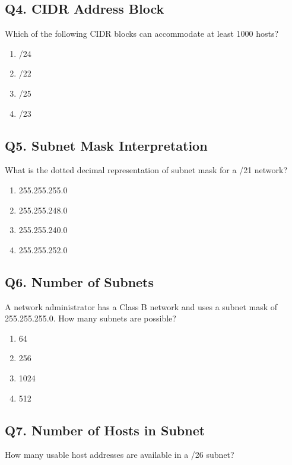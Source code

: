 \vspace{1em}
\subsection*{Q4. CIDR Address Block}
Which of the following CIDR blocks can accommodate at least 1000 hosts?

\begin{enumerate}[label=(\alph*)]
    \item /24  
    \item /22  
    \item /25  
    \item /23  
\end{enumerate}

\vspace{1em}
\subsection*{Q5. Subnet Mask Interpretation}
What is the dotted decimal representation of subnet mask for a /21 network?

\begin{enumerate}[label=(\alph*)]
    \item 255.255.255.0  
    \item 255.255.248.0  
    \item 255.255.240.0  
    \item 255.255.252.0  
\end{enumerate}

\vspace{1em}
\subsection*{Q6. Number of Subnets}
A network administrator has a Class B network and uses a subnet mask of 255.255.255.0. How many subnets are possible?

\begin{enumerate}[label=(\alph*)]
    \item 64  
    \item 256  
    \item 1024  
    \item 512  
\end{enumerate}

\vspace{1em}
\subsection*{Q7. Number of Hosts in Subnet}
How many usable host addresses are available in a /26 subnet?

